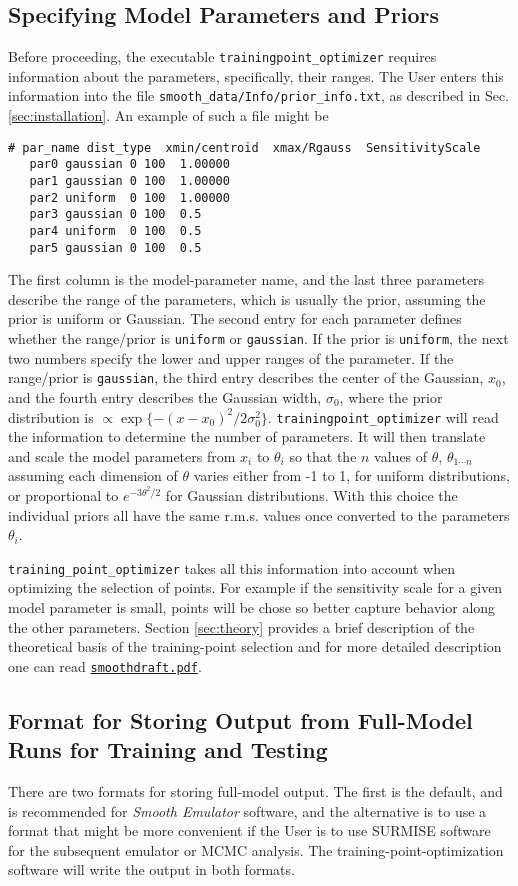 \documentclass[UserManual.tex]{subfiles}
\begin{document}
\subsection{Specifying Model Parameters and Priors}\label{subsec:priorinfo}
Before proceeding, the executable {\tt trainingpoint\_optimizer} requires information about the parameters, specifically, their ranges. The User enters this information into the file {\tt smooth\_data/Info/prior\_info.txt}, as described in Sec. \ref{sec:installation}. An example of such a file might be
{\tt\begin{verbatim}
# par_name dist_type  xmin/centroid  xmax/Rgauss  SensitivityScale
   par0 gaussian 0 100  1.00000
   par1 gaussian 0 100  1.00000
   par2 uniform  0 100  1.00000
   par3 gaussian 0 100  0.5
   par4 uniform  0 100  0.5
   par5 gaussian 0 100  0.5
\end{verbatim}
}
The first column is the model-parameter name, and the last three parameters describe the range of the parameters, which is usually the prior, assuming the prior is uniform or Gaussian. The second entry for each parameter defines whether the range/prior is {\tt uniform} or {\tt gaussian}. If the prior is {\tt uniform}, the next two numbers specify the lower and upper ranges of the parameter. If the range/prior is {\tt gaussian}, the third entry describes the center of the Gaussian, $x_0$, and the fourth entry describes the Gaussian width, $\sigma_0$, where the prior distribution is $\propto \exp\{-(x-x_0)^2/2\sigma_0^2\}$. {\tt trainingpoint\_optimizer} will read the information to determine the number of parameters. It will then translate and scale the model parameters from $x_i$ to $\theta_i$ so that the $n$ values of $\theta$, $\theta_{1\cdots n}$ assuming each dimension of $\theta$ varies either from -1 to 1, for uniform distributions, or proportional to $e^{-3\theta^2/2}$ for Gaussian distributions. With this choice the individual priors all have the same r.m.s. values once converted to the parameters $\theta_i$.

{\tt training\_point\_optimizer} takes all this information into account when optimizing the selection of points. For example if the sensitivity scale for a given model parameter is small, points will be chose so better capture behavior along the other parameters. Section \ref{sec:theory} provides a brief description of the theoretical basis of the training-point selection and for more detailed description one can read \href{./smoothdraft.pdf}{{\tt smoothdraft.pdf}}.

\subsection{Format for Storing Output from Full-Model Runs for Training and Testing}
There are two formats for storing full-model output. The first is the default, and is recommended for {\it Smooth Emulator} software, and the alternative is to use a format that might be more convenient if the User is to use SURMISE software for the subsequent emulator or MCMC analysis. The training-point-optimization software will write the output in both formats.
\end{document}
